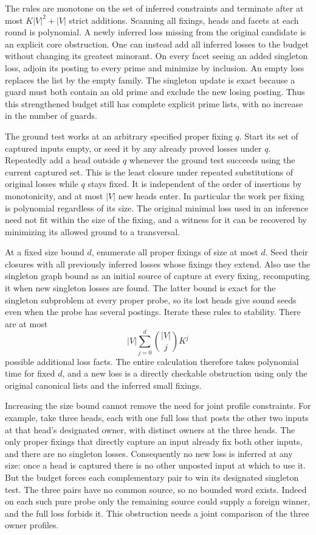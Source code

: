 The rules are monotone on the set of inferred
constraints and terminate after at most
$K|V|^2+|V|$ strict additions. Scanning all fixings,
heads and facets at each round is polynomial.
A newly inferred loss missing from the original
candidate is an explicit core obstruction. One
can instead add all inferred losses to the budget
without changing its greatest minorant. On every
facet seeing an added singleton loss, adjoin its
posting to every prime and minimize by inclusion.
An empty loss replaces the list by the empty
family. The singleton update is exact because a
guard must both contain an old prime and exclude
the new losing posting. Thus this strengthened
budget still has complete explicit prime lists,
with no increase in the number of guards.

The ground test works at an arbitrary specified proper
fixing $q$. Start its set of captured inputs empty,
or seed it by any already proved losses under $q$.
Repeatedly add a head outside $q$ whenever the ground
test succeeds using the current captured set. This is
the least closure under repeated substitutions of
original losses while $q$ stays fixed. It is independent
of the order of insertions by monotonicity, and at most
$|V|$ new heads enter. In particular the work per fixing
is polynomial regardless of its size. The original
minimal loss used in an inference need not fit within
the size of the fixing, and a witness for it can be
recovered by minimizing its allowed ground to a
transversal.

At a fixed size bound $d$, enumerate all proper fixings
of size at most $d$. Seed their closures with all
previously inferred losses whose fixings they extend.
Also use the singleton graph bound as an initial source
of capture at every fixing, recomputing it when new
singleton losses are found. The latter bound is exact
for the singleton subproblem at every proper probe,
so its lost heads give sound seeds even when the probe
has several postings. Iterate these rules to stability.
There are at most
\[
 |V|\sum_{j=0}^{d}\binom{|V|}{j}K^j
\]
possible additional loss facts. The entire calculation
therefore takes polynomial time for fixed $d$, and a
new loss is a directly checkable obstruction using
only the original canonical lists and the inferred
small fixings.

Increasing the size bound cannot remove the need for
joint profile constraints. For example, take three
heads, each with one full loss that posts the other
two inputs at that head's designated owner, with
distinct owners at the three heads. The only proper
fixings that directly capture an input already fix
both other inputs, and there are no singleton losses.
Consequently no new loss is inferred at any size:
once a head is captured there is no other unposted
input at which to use it. But the budget forces
each complementary pair to win its designated
singleton test. The three pairs have no common
source, so no bounded word exists. Indeed on each
such pure probe only the remaining source could
supply a foreign winner, and the full loss forbids
it. This obstruction needs a joint comparison of
the three owner profiles.

